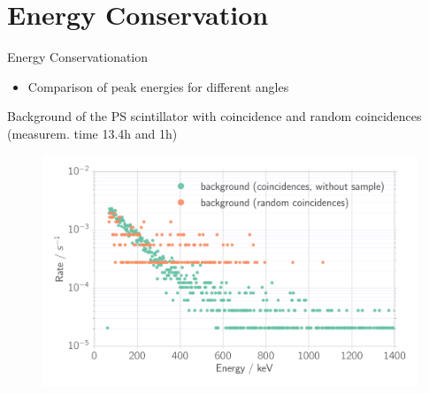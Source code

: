 \documentclass[xcolor=x11names,compress]{beamer}
\renewcommand{\(}{\begin{columns}}
\renewcommand{\)}{\end{columns}}
\newcommand{\<}[1]{\begin{column}{#1}}
\renewcommand{\>}{\end{column}}
\begin{document}
\section{Energy Conservation}
\begin{frame}[t]{Energy Conservationation}
    \begin{itemize}
        \item Comparison of peak energies for different angles
    \end{itemize}
\end{frame}
\begin{frame}[t]{Background of the PS scintillator with coincidence
    and random coincidences (measurem. time 13.4h and 1h)}
    \begin{figure}[htpb]
    \centering
    \includegraphics[width=1.0\linewidth]{../analysis/figures/coin_background_random}
    \label{fig:coin_ps_background}
\end{figure}

\end{frame}
\end{document}
